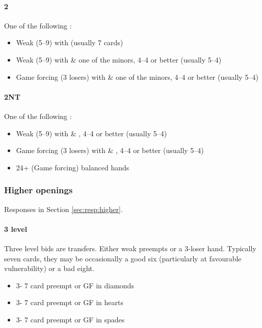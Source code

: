 \documentclass[a4paper,14pt]{extarticle}
\begin{document}
\paragraph{2\spades}
One of the following :
\begin{itemize}
\item Weak (5--9) with \clubs (usually 7 cards)
\item Weak (5--9) with \hearts \& one of the minors, 4--4 or better (usually 5--4)
\item Game forcing (3 losers) with \hearts \& one of the minors, 4--4 or better (usually 5--4)
\end{itemize}

\paragraph{2NT}
One of the following :
\begin{itemize}
\item Weak (5--9) with \spades \& \diamonds, 4--4 or better (usually 5--4)
\item Game forcing (3 losers) with \spades \& \diamonds, 4--4 or better (usually 5--4)
\item 24+ (Game forcing) balanced hands
\end{itemize}

\subsubsection{Higher openings}
\label{sec:open:higher}

Responses in Section \ref{sec:resp:higher}.

\paragraph{3 level}

Three level bids are transfers. Either weak preempts or a 3-loser hand.
Typically seven cards, they may be occasionally a good six (particularly at
favourable vulnerability) or a bad eight.

\begin{itemize}
\item 3\clubs - 7 card preempt or GF in diamonds 
\item 3\diamonds - 7 card preempt or GF in hearts 
\item 3\hearts - 7 card preempt or GF in spades 
\end{itemize}
\end{document}
